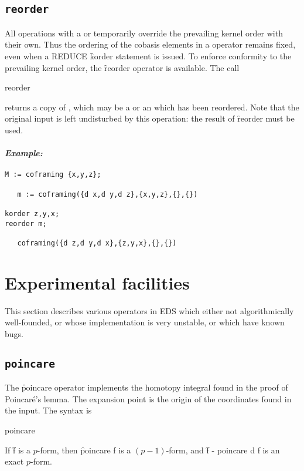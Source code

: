 \subsection{\tt reorder}
\label{reorder}

All operations with a  or  temporarily override
the prevailing kernel order with their own. Thus the ordering of the
cobasis elements in a  operator remains fixed, even when a
REDUCE \f{korder} statement is issued. To enforce conformity to the
prevailing kernel order, the \f{reorder} operator is available. The call
\begin{syntax}
	reorder 
\end{syntax}
returns a copy of , which may be a  or an
 which has been reordered. Note that the original input is left
undisturbed by this operation: the result of \f{reorder} must be used.

\paragraph{\it Example:}
\begin{verbatim}
M := coframing {x,y,z};

   m := coframing({d x,d y,d z},{x,y,z},{},{}) 

korder z,y,x;
reorder m;

   coframing({d z,d y,d x},{z,y,x},{},{}) 
\end{verbatim}




\section{Experimental facilities}
\label{Experimental facilities}

This section describes various operators in EDS which either not
algorithmically well-founded, or whose implementation is very unstable, or
which have known bugs.


\subsection{\tt poincare}
\label{poincare}

The \f{poincare} operator implements the homotopy integral found in the
proof of Poincar{\'e}'s lemma. The expansion point is the origin of the
coordinates found in the input. The syntax is
\begin{syntax}
	poincare 
\end{syntax}
If \f{f} is a $p$-form, then \f{poincare f} is a $(p-1)$-form, and
\f{f - poincare d f} is an exact $p$-form.

